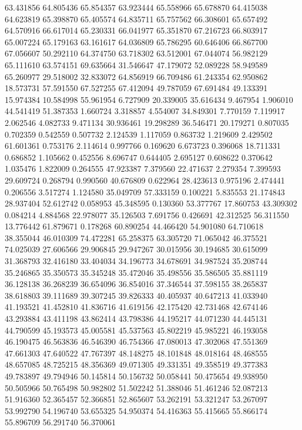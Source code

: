 63.431856
64.805436
65.854357
63.923444
65.558966
65.678870
64.415038
64.623819
65.398870
65.405574
64.835711
65.757562
66.308601
65.657492
64.570916
66.617014
65.230331
66.041977
65.351870
67.216723
66.803917
65.007224
65.179163
63.161617
64.036809
65.786295
60.646406
66.867700
67.056607
50.292110
64.374750
63.718302
63.512001
67.044074
56.982129
65.111610
63.574151
69.635664
31.546647
47.179072
52.089228
58.949589
65.260977
29.518002
32.833072
64.856919
66.709486
61.243354
62.950862
18.573731
57.591550
67.527255
67.412094
49.787059
67.691484
49.133391
15.974384
10.584998
55.961954
6.727909
20.339005
35.616434
9.467954
1.906010
44.541419
51.387353
1.660724
3.318857
4.554007
34.849301
7.770159
7.119917
2.062546
4.082733
9.471134
30.936461
19.298289
36.546471
20.179271
0.807035
0.702359
0.542559
0.507732
2.124539
1.117059
0.863732
1.219609
2.429502
61.601361
0.753176
2.114614
0.997766
0.169620
6.673723
0.396068
18.711331
0.686852
1.105662
0.452556
8.696747
0.644405
2.695127
0.608622
0.370642
1.035476
1.822009
0.264555
47.923387
7.379560
22.471637
2.279354
7.399593
29.609724
0.268794
0.990560
40.676809
0.622964
28.423613
0.975196
2.474441
0.206556
3.517274
1.124580
35.049709
57.333159
0.100221
5.835553
21.174843
28.937404
52.612742
0.058953
45.348595
0.130360
53.377767
17.860753
43.309302
0.084214
4.884568
22.978077
35.126503
7.691756
0.426691
42.312525
56.311550
13.776442
61.879671
0.178268
60.890254
44.466420
54.901080
64.710618
38.355044
46.010309
74.472281
65.258375
63.305720
71.065042
46.375521
74.025039
27.606566
29.906845
29.947267
30.015956
30.194685
30.615099
31.368793
32.416180
33.404034
34.196773
34.678691
34.987524
35.208744
35.246865
35.350573
35.345248
35.472046
35.498556
35.586505
35.881119
36.128138
36.268239
36.654096
36.854016
37.346544
37.598155
38.265837
38.618803
39.111689
39.307245
39.826333
40.405937
40.647213
41.033940
41.193521
41.452810
41.836716
41.619156
42.175420
42.731468
42.674146
43.293884
43.411198
43.862414
43.798386
44.195217
44.071230
44.445131
44.790599
45.193573
45.005581
45.537563
45.802219
45.985221
46.193058
46.190475
46.563836
46.546390
46.754366
47.080013
47.302068
47.551369
47.661303
47.640522
47.767397
48.148275
48.101848
48.018164
48.468555
48.657085
48.725215
48.356369
49.071305
49.331351
49.358519
49.377383
49.783897
49.794946
50.145814
50.156732
50.058441
50.475654
49.938950
50.505966
50.765498
50.982802
51.502242
51.388046
51.461246
52.087213
51.916360
52.365457
52.366851
52.865607
53.262191
53.321247
53.267097
53.992790
54.196740
53.655325
54.950374
54.416363
55.415665
55.866174
55.896709
56.291740
56.370061

